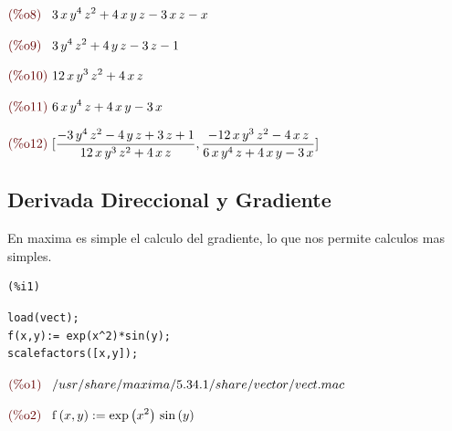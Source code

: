 \documentclass[12pt]{article}
\begin{document}
\begin{math}\displaystyle
\parbox{8ex}{\color{labelcolor}(\%o8) }
3\,x\,{y}^{4}\,{z}^{2}+4\,x\,y\,z-3\,x\,z-x
\end{math}

\begin{math}\displaystyle
\parbox{8ex}{\color{labelcolor}(\%o9) }
3\,{y}^{4}\,{z}^{2}+4\,y\,z-3\,z-1
\end{math}

\begin{math}\displaystyle
\parbox{8ex}{\color{labelcolor}(\%o10) }
12\,x\,{y}^{3}\,{z}^{2}+4\,x\,z
\end{math}

\begin{math}\displaystyle
\parbox{8ex}{\color{labelcolor}(\%o11) }
6\,x\,{y}^{4}\,z+4\,x\,y-3\,x
\end{math}

\begin{math}\displaystyle
\parbox{8ex}{\color{labelcolor}(\%o12) }
[\frac{-3\,{y}^{4}\,{z}^{2}-4\,y\,z+3\,z+1}{12\,x\,{y}^{3}\,{z}^{2}+4\,x\,z},\frac{-12\,x\,{y}^{3}\,{z}^{2}-4\,x\,z}{6\,x\,{y}^{4}\,z+4\,x\,y-3\,x}]
\end{math}
 
 \subsection{Derivada Direccional y Gradiente}
 En maxima es simple el calculo del gradiente, lo que nos permite calculos mas simples.
 
 \noindent
\begin{minipage}[t]{8ex}{\color{red}\bf
\begin{verbatim}
(%i1) 
\end{verbatim}}
\end{minipage}
\begin{minipage}[t]{\textwidth}{\color{blue}
\begin{verbatim}
load(vect);
f(x,y):= exp(x^2)*sin(y);
scalefactors([x,y]);
\end{verbatim}}
\end{minipage}
\begin{math}\displaystyle
\parbox{8ex}{\color{labelcolor}(\%o1) }
/usr/share/maxima/5.34.1/share/vector/vect.mac
\end{math}

\begin{math}\displaystyle
\parbox{8ex}{\color{labelcolor}(\%o2) }
\mathrm{f}\left( x,y\right) :=\mathrm{exp}\left( {x}^{2}\right) \,\mathrm{sin}\left( y\right) 
\end{math}
\end{document}
